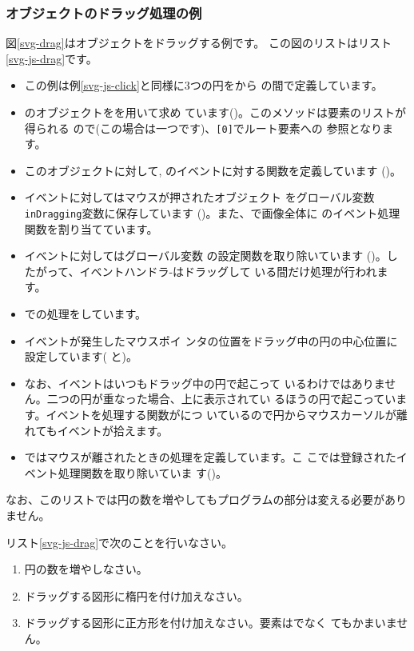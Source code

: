 \subsubsection{オブジェクトのドラッグ処理の例}
図\ref{svg-drag}はオブジェクトをドラッグする例です。
この図のリストはリスト\ref{svg-js-drag}です。
%
\newpage
{}
\begin{itemize}
 \item この例は例\ref{svg-js-click}と同様に3つの円をから
       の間で定義しています。
 \item {}のオブジェクトをを用いて求め
       ています()。このメソッドは要素のリストが得られる
       ので(この場合は一つです)、\texttt{[0]}でルート要素への
       参照となります。
 \item このオブジェクトに対して, %
        のイベントに対する関数を定義しています%
       ()。
 \item {}イベントに対してはマウスが押されたオブジェクト
       をグローバル変数\texttt{inDragging}変数に保存しています
       ()。また、で画像全体に
       のイベント処理関数を割り当てています。
 \item {}イベントに対してはグローバル変数
       の設定関数を取り除いています
       ()。したがって、イベントハンドラ-はドラッグして
       いる間だけ処理が行われます。
 \item {}での処理をしています。
 \item イベントが発生したマウスポイ
       ンタの位置をドラッグ中の円の中心位置に設定しています(
       と)。
 \item なお、イベントはいつもドラッグ中の円で起こって
       いるわけではありません。二つの円が重なった場合、上に表示されてい
       るほうの円で起こっています。イベントを処理する関数がにつ
       いているので円からマウスカーソルが離れてもイベントが拾えます。
 \item {}ではマウスが離されたときの処理を定義しています。こ
       こでは登録されたイベント処理関数を取り除いていま
       す()。
\end{itemize}
なお、このリストでは円の数を増やしてもプログラムの部分は変える必要があり
ません。
\begin{Problem}\upshape\label{check-drag-prob}
 リスト\ref{svg-js-drag}で次のことを行いなさい。
\begin{enumerate}
 \item 円の数を増やしなさい。
 \item ドラッグする図形に楕円を付け加えなさい。
 \item ドラッグする図形に正方形を付け加えなさい。要素はでなく
       てもかまいません。
 \end{enumerate}
\end{Problem}

